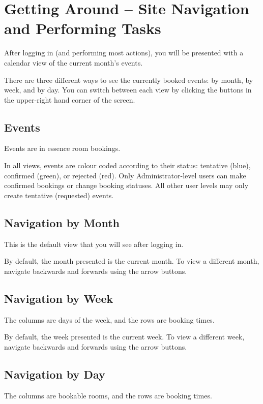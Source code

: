 \section{Getting Around -- Site Navigation and Performing Tasks}

After logging in (and performing most actions), you will be presented with a calendar view of the current month's events.

There are three different ways to see the currently booked events: by month, by week, and by day. You can switch between each view by clicking the buttons in the upper-right hand corner of the screen.


\subsection{Events}

Events are in essence room bookings.

In all views, events are colour coded according to their status: tentative (blue), confirmed (green), or rejected (red). Only Administrator-level users can make confirmed bookings or change booking statuses. All other user levels may only create tentative (requested) events.


\subsection{Navigation by Month}

This is the default view that you will see after logging in.

By default, the month presented is the current month. To view a different month, navigate backwards and forwards using the arrow buttons.


\subsection{Navigation by Week}

The columns are days of the week, and the rows are booking times.

By default, the week presented is the current week. To view a different week, navigate backwards and forwards using the arrow buttons.


\subsection{Navigation by Day}

The columns are bookable rooms, and the rows are booking times.

